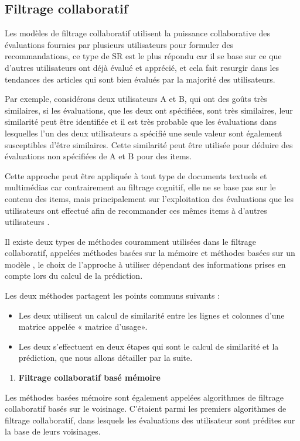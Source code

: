 \documentclass[a4paper,12pt,letterpaper,headsepline,singlespacing,headsepline, french]{report}
\begin{document}
\subsection{Filtrage collaboratif}

Les modèles de filtrage collaboratif utilisent la puissance collaborative des évaluations fournies par plusieurs utilisateurs pour formuler des recommandations, ce type de SR est le plus répondu car il se base sur ce que d’autres utilisateurs ont déjà évalué et apprécié, et cela fait resurgir dans les tendances des articles qui sont bien évalués par la majorité des utilisateurs.

Par exemple, considérons deux utilisateurs A et B, qui ont des goûts très similaires, si les évaluations, que les deux ont spécifiées, sont très similaires, leur similarité peut être identifiée et il est très probable que les évaluations dans lesquelles l’un des deux utilisateurs a spécifié une seule valeur sont également susceptibles d'être similaires. 
Cette similarité peut être utilisée pour déduire des évaluations non spécifiées de A et B pour des items.  

Cette approche peut être appliquée à tout type de documents textuels et multimédias car contrairement au filtrage cognitif, elle ne se base pas sur le contenu des items, mais principalement sur l’exploitation des évaluations que les utilisateurs ont effectué afin de recommander ces mêmes items à d’autres utilisateurs \cite{ref8}.

Il existe deux types de méthodes couramment utilisées dans le filtrage collaboratif, appelées méthodes basées sur la mémoire et méthodes basées sur un modèle \cite{ref3}, le choix de l’approche à utiliser dépendant des informations prises en compte lors du calcul de la prédiction. 

Les deux méthodes partagent les points communs suivants :
\begin{itemize}
\item  Les deux utilisent un calcul de similarité entre les lignes et colonnes d’une matrice appelée « matrice d’usage».
\item Les deux s’effectuent en deux étapes qui sont le calcul de similarité et la prédiction, que nous allons détailler par la suite.
\end{itemize}

\begin{enumerate}[nosep,label=\textbf{\arabic*)}]
	\item \textbf{Filtrage collaboratif basé mémoire}
\end{enumerate}\mbox{}\indent Les méthodes basées mémoire sont également appelées algorithmes de filtrage collaboratif basés sur le voisinage. C'étaient parmi les premiers algorithmes de filtrage collaboratif, dans lesquels les évaluations des utilisateur sont prédites sur la base de leurs voisinages\cite{ref3}.
\end{document}

